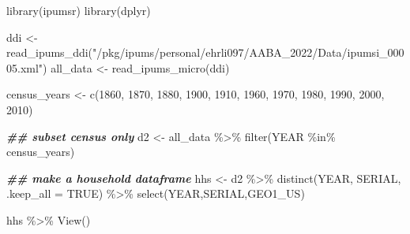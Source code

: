 \documentclass[
]{book}
\newenvironment{Shaded}{\begin{snugshade}}{\end{snugshade}}
\newcommand{\AttributeTok}[1]{\textcolor[rgb]{0.77,0.63,0.00}{#1}}
\newcommand{\ConstantTok}[1]{\textcolor[rgb]{0.00,0.00,0.00}{#1}}
\newcommand{\DecValTok}[1]{\textcolor[rgb]{0.00,0.00,0.81}{#1}}
\newcommand{\DocumentationTok}[1]{\textcolor[rgb]{0.56,0.35,0.01}{\textbf{\textit{#1}}}}
\newcommand{\FunctionTok}[1]{\textcolor[rgb]{0.00,0.00,0.00}{#1}}
\newcommand{\NormalTok}[1]{#1}
\newcommand{\OtherTok}[1]{\textcolor[rgb]{0.56,0.35,0.01}{#1}}
\newcommand{\SpecialCharTok}[1]{\textcolor[rgb]{0.00,0.00,0.00}{#1}}
\newcommand{\StringTok}[1]{\textcolor[rgb]{0.31,0.60,0.02}{#1}}
\begin{document}
\begin{Shaded}
\begin{Highlighting}[]
\FunctionTok{library}\NormalTok{(ipumsr)}
\FunctionTok{library}\NormalTok{(dplyr)}

\NormalTok{ddi }\OtherTok{\textless{}{-}} \FunctionTok{read\_ipums\_ddi}\NormalTok{(}\StringTok{"/pkg/ipums/personal/ehrli097/AABA\_2022/Data/ipumsi\_00005.xml"}\NormalTok{)}
\NormalTok{all\_data }\OtherTok{\textless{}{-}} \FunctionTok{read\_ipums\_micro}\NormalTok{(ddi)}

\NormalTok{census\_years }\OtherTok{\textless{}{-}} \FunctionTok{c}\NormalTok{(}\DecValTok{1860}\NormalTok{, }\DecValTok{1870}\NormalTok{, }\DecValTok{1880}\NormalTok{, }\DecValTok{1900}\NormalTok{, }\DecValTok{1910}\NormalTok{, }\DecValTok{1960}\NormalTok{, }\DecValTok{1970}\NormalTok{, }\DecValTok{1980}\NormalTok{, }\DecValTok{1990}\NormalTok{, }\DecValTok{2000}\NormalTok{, }\DecValTok{2010}\NormalTok{)}

\DocumentationTok{\#\# subset census only}
\NormalTok{d2 }\OtherTok{\textless{}{-}}\NormalTok{ all\_data }\SpecialCharTok{\%\textgreater{}\%} \FunctionTok{filter}\NormalTok{(YEAR }\SpecialCharTok{\%in\%}\NormalTok{ census\_years)}

\DocumentationTok{\#\# make a household dataframe}
\NormalTok{hhs }\OtherTok{\textless{}{-}}\NormalTok{ d2 }\SpecialCharTok{\%\textgreater{}\%} \FunctionTok{distinct}\NormalTok{(YEAR, SERIAL, }\AttributeTok{.keep\_all =} \ConstantTok{TRUE}\NormalTok{) }\SpecialCharTok{\%\textgreater{}\%} \FunctionTok{select}\NormalTok{(YEAR,SERIAL,GEO1\_US)}

\NormalTok{hhs }\SpecialCharTok{\%\textgreater{}\%} \FunctionTok{View}\NormalTok{()}
\end{Highlighting}
\end{Shaded}
\end{document}
